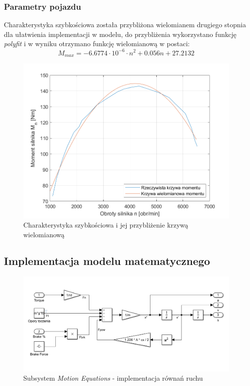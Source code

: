 \documentclass[12pt, a4paper, headings=normal]{article}
\begin{document}
\subsubsection{Parametry pojazdu}

Charakterystyka szybkościowa została przybliżona wielomianem drugiego stopnia
dla ułatwienia implementacji w modelu, do przybliżenia wykorzystano funkcję \textit{polyfit} i w wyniku
otrzymano funkcję wielomianową w postaci:
\begin{equation}
	M_{max} = -6.6774 \cdot 10^{-6} \cdot n^2 + 0.056 n + 27.2132
	\label{eq:trq_poly}
\end{equation}

\begin{figure}[H]
	\centering
	\includegraphics[width=.7\textwidth]{trq_curve.png}
	\caption{Charakterystyka szybkościowa i jej przybliżenie krzywą wielomianową}
	\label{fig:trq_curve}
\end{figure}


\subsection{Implementacja modelu matematycznego}

\begin{figure}[H]
	\centering
	\includegraphics[width=.9\textwidth]{"eq_model.png"}
	\caption{Subsystem \textit{Motion Equations} - implementacja równań ruchu}
	\label{fig:mtneqs}
\end{figure}
\end{document}
